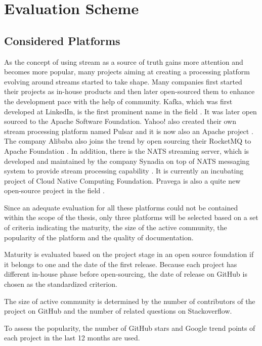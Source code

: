 \chapter{Evaluation Scheme} \label{chap:evaluation-scheme}

\section{Considered Platforms}
As the concept of using stream as a source of truth gains more attention and becomes more popular, many projects aiming at creating a processing platform evolving around streams started to take shape. 
Many companies first started their projects as in-house products and then later open-sourced them to enhance the development pace with the help of community. Kafka, which was first developed at LinkedIn, is the first prominent name in the field \cite{apachekafka}. It was later open sourced to the Apache Software Foundation. Yahoo! also created their own stream processing platform named Pulsar and it is now also an Apache project \cite{apachepulsar}. The company Alibaba also joins the trend by open sourcing their RocketMQ to Apache Foundation \cite{rocketmq}. In addition, there is the NATS streaming server, which is developed and maintained by the company Synadia on top of NATS messaging system to provide stream processing capability \cite{natsstreaming}. It is currently an incubating project of Cloud Native Computing Foundation. Pravega is also a quite new open-source project in the field \cite{pravega}. 

Since an adequate evaluation for all these platforms could not be contained within the scope of the thesis, only three platforms will be selected based on a set of criteria indicating the maturity, the size of the active community, the popularity of the platform and the quality of documentation.

Maturity is evaluated based on the project stage in an open source foundation if it belongs to one and the date of the first release. Because each project has different in-house phase before open-sourcing, the date of release on GitHub is chosen as the standardized criterion.

The size of active community is determined by the number of contributors of the project on GitHub and the number of related questions on Stackoverflow.

To assess the popularity, the number of GitHub stars and Google trend points of each project in the last 12 months are used.

